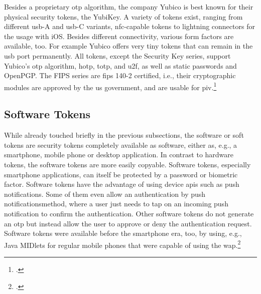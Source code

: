 Besides a proprietary \gls{otp} algorithm, the company Yubico is best known for their physical security tokens, the YubiKey. A variety of tokens exist, ranging from different \gls{usb}-A and \gls{usb}-C variants, \gls{nfc}-capable tokens to lightning connectors for the usage with iOS. Besides different connectivity, various form factors are available, too. For example Yubico offers very tiny tokens that can remain in the \gls{usb} port permanently. All tokens, except the \frqq Security Key\flqq{} series, support Yubico's \gls{otp} algorithm, \gls{hotp}, \gls{totp}, and \gls{u2f}, as well as static passwords and OpenPGP. The \frqq FIPS series\flqq{} are \gls{fips} 140-2 certified, i.e., their cryptographic modules are approved by the \gls{us} government, and are usable for \gls{piv}.\footcites[See][716]{HUSEYNOV2017715}[See][83]{Jacobs:2016:STA:2953926.2953927}[See][109]{Jacobs:2019}

\subsection{Software Tokens}

While already touched briefly in the previous subsections, the software or soft tokens are security tokens completely available as software, either as, e.g., a smartphone, mobile phone or desktop application. In contrast to hardware tokens, the software tokens are more easily copyable. Software tokens, especially smartphone applications, can itself be protected by a password or biometric factor. Software tokens have the advantage of using device \glspl{api} such as push notifications. Some of them even allow an \frqq authentication by push notifications\flqq method, where a user just needs to tap on an incoming push notification to confirm the authentication. Other software tokens do not generate an \gls{otp} but instead allow the user to approve or deny the authentication request. Software tokens were available before the smartphone era, too, by using, e.g., Java MIDlets for regular mobile phones that were capable of using the \gls{wap}.\footcites[See][717]{HUSEYNOV2017715}[See][111]{ELMALIKI201475}[See][60]{Ulqinaku:2019:FPP:3317549.3323404}[See][222--223]{dasgupta2017multi}[See][3]{4300040}
